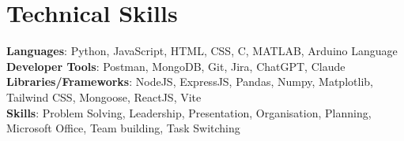 \documentclass[letterpaper,11pt]{article}
\begin{document}
\section{Technical Skills}
 \begin{itemize}[leftmargin=0.15in, label={}]
    \small{\item{   
     \textbf{Languages}{: Python, JavaScript, HTML, CSS, C, MATLAB, Arduino Language} \\[1mm]
     \textbf{Developer Tools}{: Postman, MongoDB, Git, Jira, ChatGPT, Claude} \\[1mm]
     \textbf{Libraries/Frameworks}{: NodeJS, ExpressJS, Pandas, Numpy, Matplotlib, Tailwind CSS, Mongoose, ReactJS, Vite} \\ [1mm]
     \textbf{Skills}{: Problem Solving, Leadership, Presentation, Organisation, Planning, Microsoft Office, Team building, Task Switching} \\ [1mm]
    }}
 \end{itemize}
 \vspace{-16pt}
 \vspace{3pt}
\vspace{10pt}

\vspace{-15pt}
\end{document}
